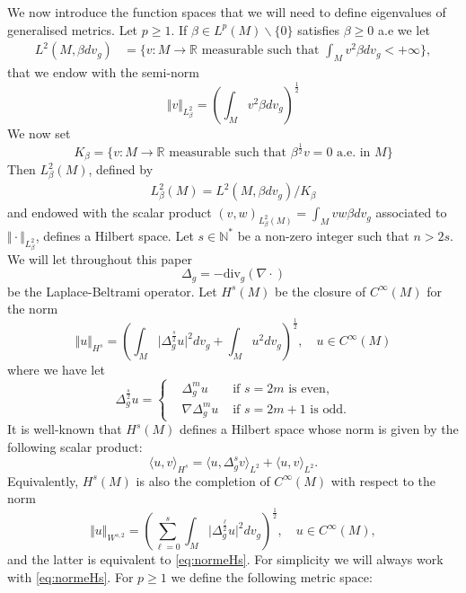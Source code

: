 \documentclass[10pt]{amsart}
\numberwithin{equation}{section}
\newcommand{\R}{\mathbb{R}}
\newcommand{\N}{\mathbb{N}}
\theoremstyle{plain}
\theoremstyle{remark}
\begin{document}
We now introduce the function spaces that we will need to define eigenvalues of generalised metrics. Let $p\geq 1$. If $\beta \in L^p(M) \backslash \{0\}$ satisfies $\beta \geq 0$ a.e we let
$$ \begin{aligned}
L^2(M, \beta dv_g) 
  &= \Big \{ v: M \to \R \text{ measurable such that }\int_{M}  v^2 \beta dv_g < + \infty \Big \},
\end{aligned} $$
that we endow with the semi-norm
$$ \Vert v \Vert_{L^2_\beta} = \left(\int_{M}  v^2 \beta dv_g\right)^{\frac{1}{2}} $$
We now set 
\begin{equation} \label{def:Kbeta}
K_\beta = \Big \{ v: M \to \R \text{ measurable such that }  \beta^{\frac{1}{2}} v = 0 \text{ a.e. in } M \Big \} 
\end{equation}
Then $L^2_\beta(M)$, defined by
$$ \begin{aligned}
L^2_\beta(M) = L^2(M, \beta dv_g) / K_\beta
 \end{aligned}  $$
and endowed with the scalar product $(v,w)_{L^2_\beta(M)} = \int_{M}  vw \beta dv_g$ associated to $\Vert \cdot \Vert_{L^2_\beta}$, defines a Hilbert space. Let $s\in \N^*$ be a non-zero integer such that $n>2s$. We will let throughout this paper
$$ \Delta_g = - \text{div}_g (\nabla \cdot ) $$
be the Laplace-Beltrami operator. Let $H^s(M)$ be the closure of $C^\infty(M)$ for the norm 
\begin{equation} \label{eq:normeHs}
\Vert u \Vert_{H^s} = \left( \int_M \big|\Delta_g^{\frac{s}{2}} u \big|^2 dv_g +\int_M u^2 dv_g \right)^{\frac{1}{2}} , \quad u \in C^\infty(M)
\end{equation}
where we have let 
$$\Delta_g^{\frac{s}{2}} u = \left \{ 
\begin{aligned}
& \Delta_g^{m } u & \text{ if } s = 2m \text{ is even}, \\
& \nabla  \Delta_g^{m } u & \text{ if } s = 2m+1 \text{ is odd}.
\end{aligned} \right. $$
It is well-known that $H^s(M)$ defines a Hilbert space whose norm is given by the following scalar product: 
\begin{equation} \label{eq:scal:Hs}
\langle u, v \rangle_{H^s} =\langle u , \Delta_g^s v \rangle_{L^2} + \langle u, v\rangle_{L^2} .
\end{equation}
Equivalently, $H^s(M)$ is also the completion of $C^\infty(M)$ with respect to the norm 
 $$\Vert u \Vert_{W^{s,2}} = \left( \sum_{\ell=0}^s \int_M \big|\Delta_g^{\frac{\ell}{2}} u \big|^2 dv_g  \right)^{\frac{1}{2}} , \quad u \in C^\infty(M),$$
 and the latter is equivalent to \eqref{eq:normeHs}. For simplicity we will always work with \eqref{eq:normeHs}. For $p \ge 1$ we define the following metric space:
\end{document}
